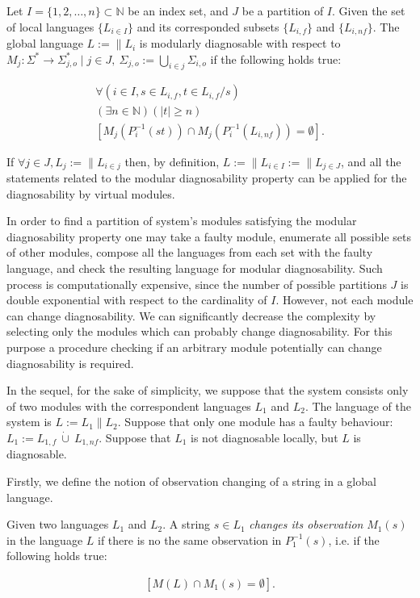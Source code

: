 \documentclass[letterpaper, 10pt, conference]{ieeeconf}
\begin{document}
\begin{definition} 
Let $I = \{1,2,\ldots,n\} \subset  \mathbb{N}$ be an index set, and $J$ be a
partition of $I$. Given the set of local languages $\{L_{i \in I}\}$ and its
corresponded subsets $\{L_{i,f}\}$ and $\{L_{i,nf}\}$. The global language $L :=
\parallel L_i$ is modularly diagnosable with respect to
$M_j: \Sigma^* \rightarrow \Sigma_{j,o}^* 
\mid j \in J, ~\Sigma_{j,o} :=\bigcup_{i \in j} \Sigma_{i,o}$ 
if the following holds true:
\end{definition}
\begin{equation}
\begin{array}{l}
	\forall(i \in I, s \in L_{i,f}, t \in L_{i,f}/s)
	\\
	(\exists n \in \mathbb{N})
	(|t| \geq n)
	\\
	\left[ M_j(P_i^{-1}(st)) \cap M_j(P_i^{-1}(L_{i,nf})) = \emptyset \right].
\end{array}
\end{equation}

If $\forall j \in J, L_{j} := \parallel L_{i \in j}$ then, by definition, $L :=
\parallel L_{i \in I} := \parallel L_{j \in J}$, and all the statements related
to the modular diagnosability  property can be applied for the diagnosability by
virtual modules.

In order to find a partition of system's modules satisfying the modular
diagnosability property one may take a faulty module, enumerate all possible
sets of other modules, compose all the languages from each set with the faulty
language, and check the resulting language for modular diagnosability.
Such process is computationally expensive, since the number of possible
partitions $J$ is double exponential with respect to the cardinality of $I$.
However, not each module can change diagnosability. We can significantly decrease the
complexity by selecting only the modules which can probably change
diagnosability. For this purpose a procedure checking if an arbitrary module
potentially can change diagnosability is required.

In the sequel, for the sake of simplicity, we suppose that the system consists
only of two modules with the correspondent languages $L_1$ and $L_2$. The
language of the system is $L := L_1 \parallel L_2$. Suppose that only one module
has a faulty behaviour: $L_1 := L_{1,f} ~\dot{\cup}~ L_{1,nf}$.
Suppose that $L_1$ is not diagnosable locally, but $L$ is diagnosable.

Firstly, we define the notion of observation changing of a string in a global
language.
\begin{definition}Given two languages $L_1$ and $L_2$. A string $s \in
L_1$ \emph{changes its observation} $M_1(s)$ in the language $L$ if
there is no the same observation in $P_1^{-1}(s)$, i.e.
if the following holds true:
\end{definition}
\begin{equation}
\label{def:obs}
\begin{array}{l}
	\left[ M(L) \cap M_1(s) = \emptyset \right].
\end{array}
\end{equation}
\end{document}
